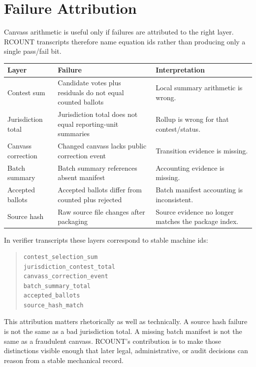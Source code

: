 \section{Failure Attribution}

Canvass arithmetic is useful only if failures are attributed to the right layer.
RCOUNT transcripts therefore name equation ids rather than producing only a
single pass/fail bit.

\begin{center}
\small
\begin{tabularx}{\textwidth}{lXX}
\toprule
Layer & Failure & Interpretation \\
\midrule
Contest sum & Candidate votes plus residuals do not equal counted ballots & Local summary arithmetic is wrong. \\
Jurisdiction total & Jurisdiction total does not equal reporting-unit summaries & Rollup is wrong for that contest/status. \\
Canvass correction & Changed canvass lacks public correction event & Transition evidence is missing. \\
Batch summary & Batch summary references absent manifest & Accounting evidence is missing. \\
Accepted ballots & Accepted ballots differ from counted plus rejected & Batch manifest accounting is inconsistent. \\
Source hash & Raw source file changes after packaging & Source evidence no longer matches the package index. \\
\bottomrule
\end{tabularx}
\end{center}

In verifier transcripts these layers correspond to stable machine ids:
\begin{quote}
\small
\begin{verbatim}
contest_selection_sum
jurisdiction_contest_total
canvass_correction_event
batch_summary_total
accepted_ballots
source_hash_match
\end{verbatim}
\end{quote}

This attribution matters rhetorically as well as technically. A source hash
failure is not the same as a bad jurisdiction total. A missing batch manifest is
not the same as a fraudulent canvass. RCOUNT's contribution is to make those
distinctions visible enough that later legal, administrative, or audit decisions
can reason from a stable mechanical record.

